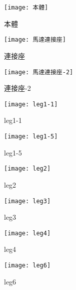 \begin{figure}[htbp]
  \begin{minipage}[t]{0.3\linewidth}
    \centering
    \texttt{[image: 本體]}
    \caption{本體}
    \label{本體}
  \end{minipage}
  \hfill
  \begin{minipage}[t]{0.3\linewidth}
    \centering
    \texttt{[image: 馬達連接座]}
    \caption{連接座}
    \label{馬達連接座}
  \end{minipage}
  \hfill
  \begin{minipage}[t]{0.3\linewidth}
    \centering
    \texttt{[image: 馬達連接座-2]}
    \caption{連接座-2}
    \label{馬達連接座-2}
  \end{minipage}
\end{figure}
\newpage

\begin{figure}[htbp]
  \begin{minipage}[t]{0.3\linewidth}
    \centering
    \texttt{[image: leg1-1]}
    \caption{leg1-1}
    \label{leg1-1}
  \end{minipage}
  \hfill
  \begin{minipage}[t]{0.3\linewidth}
    \centering
    \texttt{[image: leg1-5]}
    \caption{leg1-5}
    \label{leg1-5}
  \end{minipage}
  \hfill
  \begin{minipage}[t]{0.3\linewidth}
    \centering
    \texttt{[image: leg2]}
    \caption{leg2}
    \label{leg2}
  \end{minipage}
\end{figure}

\begin{figure}[htbp]
  \begin{minipage}[t]{0.3\linewidth}
    \centering
    \texttt{[image: leg3]}
    \caption{leg3}
    \label{leg3}
  \end{minipage}
  \hfill
  \begin{minipage}[t]{0.3\linewidth}
    \centering
    \texttt{[image: leg4]}
    \caption{leg4}
    \label{leg4}
  \end{minipage}
  \hfill
  \begin{minipage}[t]{0.3\linewidth}
    \centering
    \texttt{[image: leg6]}
    \caption{leg6}
    \label{leg6}
  \end{minipage}
\end{figure}

